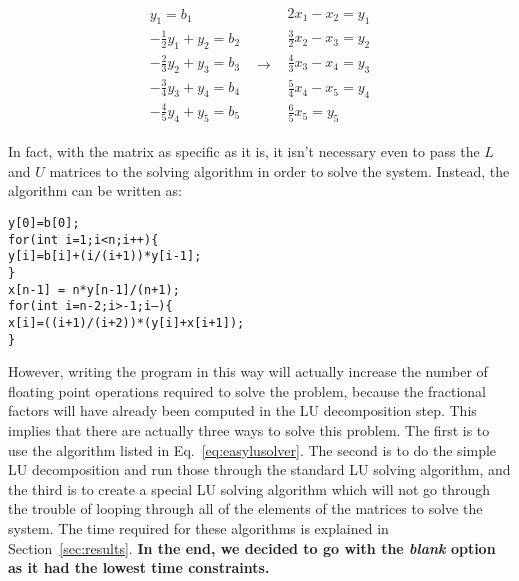 \documentclass[12pt]{article}
\numberwithin{equation}{section}
\begin{document}
\begin{equation}
\label{eq:easylusolver}
\begin{array}{ccc}
\begin{array}{c}
y_{1}=b_{1} \\
-\frac{1}{2}y_{1}+y_{2}=b_{2} \\
-\frac{2}{3}y_{2}+y_{3}=b_{3} \\
-\frac{3}{4}y_{3}+y_{4}=b_{4} \\
-\frac{4}{5}y_{4}+y_{5}=b_{5}
\end{array} & \rightarrow &
\begin{array}{c}
2x_{1}-x_{2}=y_{1} \\
\frac{3}{2}x_{2}-x_{3}=y_{2} \\
\frac{4}{3}x_{3}-x_{4}=y_{3} \\
\frac{5}{4}x_{4}-x_{5}=y_{4} \\
\frac{6}{5}x_{5}=y_{5}
\end{array}
\end{array}
\end{equation}

\noindent In fact, with the matrix as specific as it is, it isn't necessary even to pass the $L$ and $U$ matrices to the solving algorithm in order to solve the system.  Instead, the algorithm can be written as:

\begin{1stlisting}
\noindent \texttt{y[0]=b[0]; \\ for(int i=1;i<n;i++)\{ \\ \indent y[i]=b[i]+(i/(i+1))*y[i-1]; \\ \} \\ x[n-1] = n*y[n-1]/(n+1); \\ 
for(int i=n-2;i>-1;i--)\{ \\ \indent x[i]=((i+1)/(i+2))*(y[i]+x[i+1]); \\ \}}
\end{1stlisting}

However, writing the program in this way will actually increase the number of floating point operations required to solve the problem, because the fractional factors will have already been computed in the LU decomposition step.  This implies that there are actually three ways to solve this problem.  The first is to use the algorithm listed in Eq.~\ref{eq:easylusolver}.  The second is to do the simple LU decomposition and run those through the standard LU solving algorithm, and the third is to create a special LU solving algorithm which will not go through the trouble of looping through all of the elements of the matrices to solve the system.  The time required for these algorithms is explained in Section~\ref{sec:results}. \textbf{In the end,  we decided to go with the \emph{blank} option as it had the lowest time constraints.}
\end{document}
